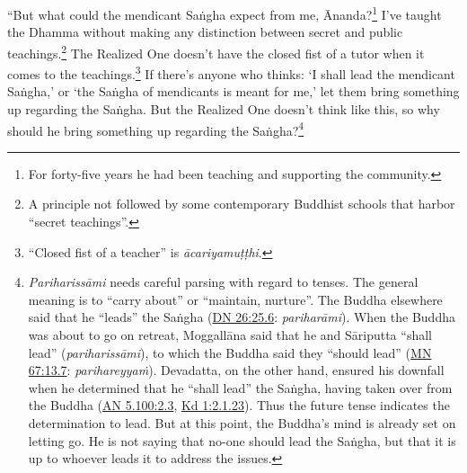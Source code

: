 \documentclass[12pt,openany]{book}%
\begin{document}
“But what could the mendicant \textsanskrit{Saṅgha} expect from me, Ānanda?\footnote{For forty-five years he had been teaching and supporting the community. } I’ve taught the Dhamma without making any distinction between secret and public teachings.\footnote{A principle not followed by some contemporary Buddhist schools that harbor “secret teachings”. } The Realized One doesn’t have the closed fist of a tutor when it comes to the teachings.\footnote{“Closed fist of a teacher” is \textit{\textsanskrit{ācariyamuṭṭhi}}. } If there’s anyone who thinks: ‘I shall lead the mendicant \textsanskrit{Saṅgha},’ or ‘the \textsanskrit{Saṅgha} of mendicants is meant for me,’ let them bring something up regarding the \textsanskrit{Saṅgha}. But the Realized One doesn’t think like this, so why should he bring something up regarding the \textsanskrit{Saṅgha}?\footnote{\textit{\textsanskrit{Pariharissāmi}} needs careful parsing with regard to tenses. The general meaning is to “carry about” or “maintain, nurture”. The Buddha elsewhere said that he “leads” the \textsanskrit{Saṅgha} (\href{https://suttacentral.net/dn26/en/sujato\#25.6}{DN 26:25.6}: \textit{\textsanskrit{pariharāmi}}). When the Buddha was about to go on retreat, \textsanskrit{Moggallāna} said that he and \textsanskrit{Sāriputta} “shall lead” (\textit{\textsanskrit{pariharissāmi}}), to which the Buddha said they “should lead” (\href{https://suttacentral.net/mn67/en/sujato\#13.7}{MN 67:13.7}: \textit{\textsanskrit{parihareyyaṁ}}). Devadatta, on the other hand, ensured his downfall when he determined that he “shall lead” the \textsanskrit{Saṅgha}, having taken over from the Buddha (\href{https://suttacentral.net/an5.100/en/sujato\#2.3}{AN 5.100:2.3}, \href{https://suttacentral.net/pli-tv-kd1/en/sujato\#2.1.23}{Kd 1:2.1.23}). Thus the future tense indicates the determination to lead. But at this point, the Buddha’s mind is already set on letting go. He is not saying that no-one should lead the \textsanskrit{Saṅgha}, but that it is up to whoever leads it to address the issues. } 
\end{document}

